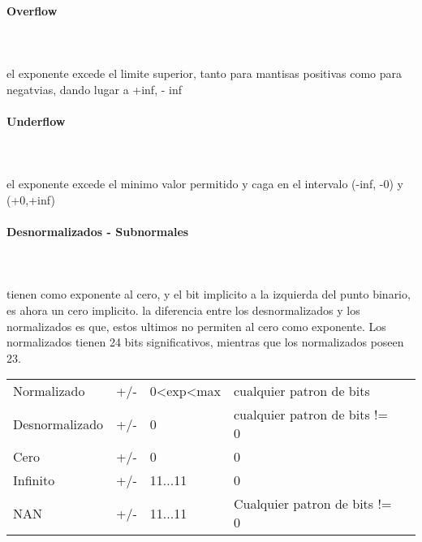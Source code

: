 \paragraph{Overflow}\mbox{}\\\\
el exponente excede el limite superior, tanto para mantisas positivas como para negatvias, dando lugar a +inf, - inf
\paragraph{Underflow}\mbox{}\\\\
el exponente excede el minimo valor permitido y caga en el intervalo (-inf, -0) y (+0,+inf)

\paragraph{Desnormalizados - Subnormales}\mbox{}\\\\
tienen como exponente al cero, y el bit implicito a la izquierda del punto binario, es ahora un cero implicito. la diferencia entre los desnormalizados y los normalizados es que, estos ultimos no permiten al cero como exponente. Los normalizados tienen 24 bits significativos, mientras que los normalizados poseen 23.

\begin{table}[h]
\begin{tabular}{lllll}
\cline{1-4}
\multicolumn{1}{|l|}{Normalizado} & \multicolumn{1}{l|}{+/-} & \multicolumn{1}{l|}{0<exp<max} &  \multicolumn{1}{l|}{cualquier patron de bits} &  \\ \cline{1-4}
\multicolumn{1}{|l|}{Desnormalizado} & \multicolumn{1}{l|}{+/-} & \multicolumn{1}{l|}{0} &  \multicolumn{1}{l|}{cualquier patron de bits != 0} &  \\ \cline{1-4}
\multicolumn{1}{|l|}{Cero} & \multicolumn{1}{l|}{+/-} & \multicolumn{1}{l|}{0} &  \multicolumn{1}{l|}{0} &  \\ \cline{1-4}
\multicolumn{1}{|l|}{Infinito} & \multicolumn{1}{l|}{+/-} & \multicolumn{1}{l|}{11...11} &  \multicolumn{1}{l|}{0} &  \\ \cline{1-4}
\multicolumn{1}{|l|}{NAN} & \multicolumn{1}{l|}{+/-} & \multicolumn{1}{l|}{11...11} &  \multicolumn{1}{l|}{Cualquier patron de bits != 0} &  \\ \cline{1-4}
\end{tabular}
\end{table}

